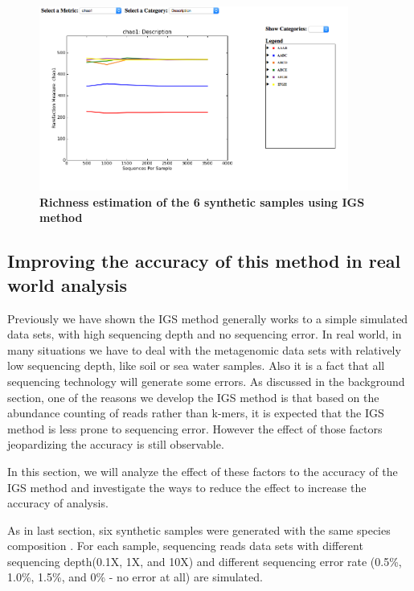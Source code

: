 \begin{figure}[!ht]
 \centerline{\includegraphics[width=4in]{./figures/simple_chao_alpha.png}}
\caption{\bf Richness estimation of the 6 synthetic samples using IGS method}
\label{fig:simple_alpha}
\end{figure}


\subsection{Improving the accuracy of this method in real world analysis}


Previously we have shown the IGS method generally works to a simple simulated
 data sets, with high sequencing depth and no sequencing error. In real world,
in many situations we have to deal with the metagenomic data sets with 
relatively low sequencing depth, like soil or sea water samples. 
Also it is a fact that all sequencing technology will generate some errors. As 
discussed in the background 
section, one of the reasons we develop the IGS method is that based on the 
abundance counting of reads rather than k-mers, it is expected that the IGS 
method is less prone to sequencing error. However the effect of those factors 
jeopardizing the accuracy is still observable. 

In this section, we will analyze the effect of these factors to the accuracy of
 the IGS method and investigate the ways to reduce the effect to increase the 
accuracy of analysis.


As in last section, six synthetic samples were generated with the same species 
composition . For each sample, sequencing reads data sets with different
sequencing depth(0.1X, 1X, and 10X) and different sequencing error rate (0.5\%,
 1.0\%, 1.5\%, and 0\% - no error at all) are simulated.


